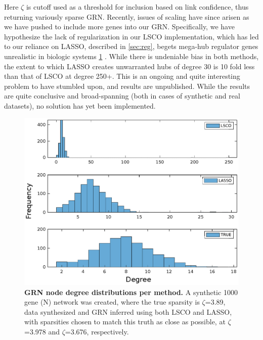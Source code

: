 Here $\zeta$ is cutoff used as a threshold for inclusion based on link confidence, thus returning variously sparse GRN. Recently, issues of scaling have since arisen as we have pushed to include more genes into our GRN. Specifically, we have hypothesize the lack of regularization in our LSCO implementation, which has led to our reliance on LASSO, described in \cref{sec:reg}, begets mega-hub regulator genes unrealistic in biologic systems \cref{fig:hubiness} \citep{bock2012hub}. While there is undeniable bias in both methods, the extent to which LASSO creates unwarranted hubs of degree 30 is 10 fold less than that of LSCO at degree 250+. This is an ongoing and quite interesting problem to have stumbled upon, and results are unpublished. While the results are quite conclusive and broad-spanning (both in cases of synthetic and real datasets), no solution has yet been implemented.

\begin{figure}[H]
\centering
\includegraphics[width=1\linewidth]{3/hubs.eps}
\caption{\textbf{GRN node degree distributions per method.} A synthetic 1000 gene (N) network was created, where the true sparsity is $\zeta$=3.89, data synthesized and GRN inferred using both LSCO and LASSO, with sparsities chosen to match this truth as close as possible, at $\zeta$=3.978 and $\zeta$=3.676, respectively.}
\label{fig:hubiness}
\end{figure}




